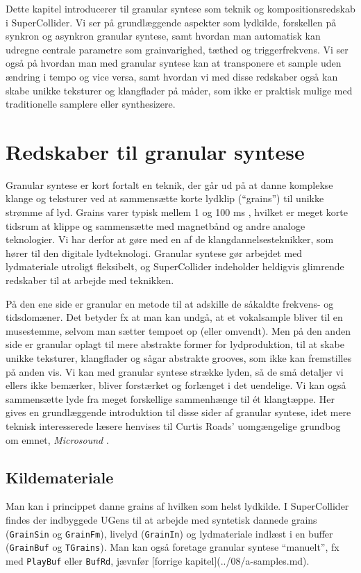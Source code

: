 

Dette kapitel introducerer til granular syntese som teknik og kompositionsredskab i SuperCollider. Vi ser på grundlæggende aspekter som lydkilde, forskellen på synkron og asynkron granular syntese, samt hvordan man automatisk kan udregne centrale parametre som grainvarighed, tæthed og triggerfrekvens. Vi ser også på hvordan man med granular syntese kan at transponere et sample uden ændring i tempo og vice versa, samt hvordan vi med disse redskaber også kan skabe unikke teksturer og klangflader på måder, som ikke er praktisk mulige med traditionelle samplere eller synthesizere.
\section{Redskaber til granular syntese}

Granular syntese er kort fortalt en teknik, der går ud på at danne komplekse klange og teksturer ved at sammensætte korte lydklip (\enquote{grains}) til unikke strømme af lyd. Grains varer typisk mellem 1 og 100 ms \parencite[p. 87]{roads2002}, hvilket er meget korte tidsrum at klippe og sammensætte med magnetbånd og andre analoge teknologier. Vi har derfor at gøre med en af de klangdannelsesteknikker, som hører til den digitale lydteknologi. Granular syntese gør arbejdet med lydmateriale utroligt fleksibelt, og SuperCollider indeholder heldigvis glimrende redskaber til at arbejde med teknikken.

På den ene side er granular en metode til at adskille de såkaldte frekvens- og tidsdomæner. Det betyder fx at man kan undgå, at et vokalsample bliver til en musestemme, selvom man sætter tempoet op (eller omvendt). Men på den anden side er granular oplagt til mere abstrakte former for lydproduktion, til at skabe unikke teksturer, klangflader og sågar abstrakte grooves, som ikke kan fremstilles på anden vis. Vi kan med granular syntese strække lyden, så de små detaljer vi ellers ikke bemærker, bliver forstærket og forlænget i det uendelige. Vi kan også sammensætte lyde fra meget forskellige sammenhænge til ét klangtæppe. Her gives en grundlæggende introduktion til disse sider af granular syntese, idet mere teknisk interesserede læsere henvises til Curtis Roads' uomgængelige grundbog om emnet, \textit{Microsound} \parencite{roads2002}.
\subsection{Kildemateriale}

Man kan i princippet danne grains af hvilken som helst lydkilde. I SuperCollider findes der indbyggede UGens til at arbejde med syntetisk dannede grains (\texttt{GrainSin} og \texttt{GrainFm}), livelyd (\texttt{GrainIn}) og lydmateriale indlæst i en buffer (\texttt{GrainBuf} og \texttt{TGrains}). Man kan også foretage granular syntese \enquote{manuelt}, fx med \texttt{PlayBuf} eller \texttt{BufRd}, jævnfør [forrige kapitel](../08/a-samples.md).

